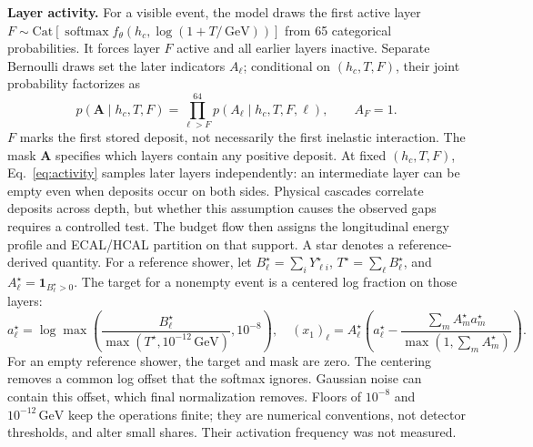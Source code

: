 \documentclass[10pt]{article}
\newcommand{\GeV}{\,\mathrm{GeV}}
\begin{document}
\textbf{Layer activity.} For a visible event, the model draws the first active layer $F\sim\mathrm{Cat}[\operatorname{softmax}f_\theta(h_c,\log(1+T/\GeV))]$ from 65 categorical probabilities. It forces layer $F$ active and all earlier layers inactive. Separate Bernoulli draws set the later indicators $A_\ell$; conditional on $(h_c,T,F)$, their joint probability factorizes as
\begin{equation}
 p(\mathbf A\mid h_c,T,F)=\prod_{\ell>F}^{64}p(A_\ell\mid h_c,T,F,\ell),
 \qquad A_F=1.
 \label{eq:activity}
\end{equation}
$F$ marks the first stored deposit, not necessarily the first inelastic interaction. The mask $\mathbf A$ specifies which layers contain any positive deposit. At fixed $(h_c,T,F)$, Eq.~\eqref{eq:activity} samples later layers independently: an intermediate layer can be empty even when deposits occur on both sides. Physical cascades correlate deposits across depth, but whether this assumption causes the observed gaps requires a controlled test. The budget flow then assigns the longitudinal energy profile and ECAL/HCAL partition on that support. A star denotes a reference-derived quantity. For a reference shower, let $B_\ell^\star=\sum_iY_{\ell i}^\star$, $T^\star=\sum_\ell B_\ell^\star$, and $A_\ell^\star=\mathbf 1_{B_\ell^\star>0}$. The target for a nonempty event is a centered log fraction on those layers:
\begin{equation}
 a_\ell^\star=\log\max\!\left(
 \frac{B_\ell^\star}{\max(T^\star,10^{-12}\GeV)},10^{-8}\right),
 \quad (x_1)_\ell=A_\ell^\star\left(
 a_\ell^\star-\frac{\sum_m A_m^\star a_m^\star}
 {\max(1,\sum_m A_m^\star)}\right).
 \label{eq:profile_target}
\end{equation}
For an empty reference shower, the target and mask are zero. The centering removes a common log offset that the softmax ignores. Gaussian noise can contain this offset, which final normalization removes. Floors of $10^{-8}$ and $10^{-12}\GeV$ keep the operations finite; they are numerical conventions, not detector thresholds, and alter small shares. Their activation frequency was not measured.
\end{document}
